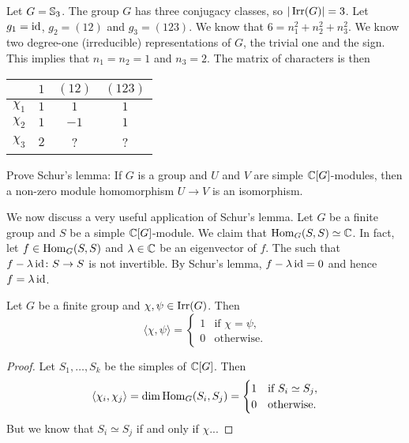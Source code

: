 \begin{example}
\label{exa:S3}
    Let $G=\mathbb{S}_3$. The group $G$ has three conjugacy classes, so
    $|\operatorname{Irr}(G)|=3$. Let $g_1=\operatorname{id}$, $g_2=(12)$ and $g_3=(123)$. We 
    know that $6=n_1^2+n_2^2+n_3^2$. We know two degree-one
    (irreducible) representations of $G$, the trivial one and
    the sign. This implies that $n_1=n_2=1$ and 
    $n_3=2$. 
    The matrix of characters is then
    \begin{center}
		\begin{tabular}{|c|ccc|}
			\hline
			& $1$ & $(12)$ & $(123)$ \tabularnewline
			\hline 
			$\chi_{1}$ & $1$ & $1$ & $1$\tabularnewline
			$\chi_{2}$ & $1$ & $-1$ & $1$ \tabularnewline
			$\chi_{3}$ & $2$ & ? & ? \tabularnewline
			\hline
		\end{tabular}
	\end{center}
\end{example}

\begin{exercise}
    Prove Schur's lemma: If $G$ is a group and  
    $U$ and $V$ are simple $\mathbb{C}[G]$-modules, then 
    a non-zero module homomorphism $U\to V$ is an isomorphism. 
\end{exercise}

We now discuss a very useful application of Schur's lemma. 
Let $G$ be a finite group and $S$ be a simple $\mathbb{C}[G]$-module.
We claim that $\operatorname{Hom}_G(S,S)\simeq\mathbb{C}$. In fact, let 
$f\in\operatorname{Hom}_G(S,S)$ and $\lambda\in\mathbb{C}$ be an eigenvector of $f$. The such that 
$f-\lambda\operatorname{id}\colon S\to S$ is not invertible. By Schur's lemma, 
$f-\lambda\operatorname{id}=0$ and hence $f=\lambda\operatorname{id}$. 

\begin{theorem}[Schur]
    Let $G$ be a finite group and $\chi,\psi\in\operatorname{Irr}(G)$. Then
    \[
    \langle\chi,\psi\rangle=\begin{cases}
    1 & \text{if $\chi=\psi$,}\\
    0 & \text{otherwise.}
    \end{cases}
    \]
\end{theorem}

\begin{proof}
    Let $S_1,\dots,S_k$ be the simples of $\mathbb{C}[G]$. Then 
    \[
    \langle\chi_i,\chi_j\rangle=\dim\operatorname{Hom}_G(S_i,S_j)
    =\begin{cases}
    1 & \text{if $S_i\simeq S_j$},\\
    0 & \text{otherwise.}
    \end{cases}
    \]
    But we know that $S_i\simeq S_j$ if and only if 
    $\chi$...
\end{proof}

